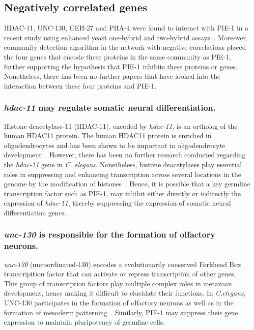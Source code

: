 \documentclass[11pt]{article}
\begin{document}
\subsection{Negatively correlated genes}
HDAC-11, UNC-130, CEH-27 and PHA-4 were found to interact with PIE-1 in a recent study using enhanced yeast one-hybrid and two-hybrid assays~\citep{Reece-Hoyes2013}. Moreover, community detection algorithm in the network with negative correlations placed the four genes that encode these proteins in the same community as PIE-1, further supporting the hypothesis that PIE-1 inhibits these proteins or genes. Nonetheless, there has been no further papers that have looked into the interaction between these four proteins and PIE-1.

\subsubsection{\textit{hdac-11} may regulate somatic neural differentiation.}
Histone deacetylase-11 (HDAC-11), encoded by \textit{hdac-11}, is an ortholog of the human HDAC11 protein. The human HDAC11 protein is enriched in oligodendrocytes and has been shown to be important in oligodendrocyte development~\citep{Liu2009}. However, there has been no further research conducted regarding the \textit{hdac-11} gene in \textit{C. elegans}. Nonetheless, histone deacetylases play essential roles in suppressing and enhancing transcription across several locations in the genome by the modification of histones~\citep{Gregoretti}. Hence, it is possible that a key germline transcription factor such as PIE-1, may inhibit either directly or indirectly the expression of \textit{hdac-11}, thereby suppressing the expression of somatic neural differentiation genes. 

\subsubsection{\textit{unc-130} is responsible for the formation of olfactory neurons.}
\textit{unc-130} (uncoordinated-130) encodes a evolutionarily conserved Forkhead Box transcripition factor that can activate or repress transcription of other genes. This group of transcription factors play multiple complex roles in metazoan development, hence making it difficult to elucidate their functions. In \textit{C.elegans}, UNC-130 participates in the formation of olfactory neurons as well as in the formation of mesoderm patterning~\citep{Kersey2016, Nash2000, Sarafi-Reinach2000}. Similarly, PIE-1 may suppress theis gene expression to maintain pluripotency of germline cells.
\end{document}
